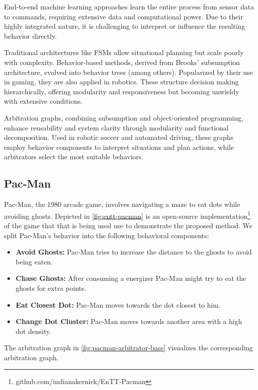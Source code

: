 End-to-end machine learning approaches learn the entire process from sensor data to commands, requiring extensive data and computational power.
Due to their highly integrated nature, it is challenging to interpret or influence the resulting behavior directly.

Traditional architectures like \glspl{FSM} allow situational planning but scale poorly with complexity. Behavior-based methods, derived from Brooks' subsumption architecture, evolved into behavior trees (among others). Popularized by their use in gaming, they are also applied in robotics. These structure decision making hierarchically, offering modularity and responsiveness but becoming unwieldy with extensive conditions.

Arbitration graphs, combining subsumption and object-oriented programming, enhance reusability and system clarity through modularity and functional decomposition. Used in robotic soccer and automated driving, these graphs employ behavior components to interpret situations and plan actions, while arbitrators select the most suitable behaviors.

\subsection{Pac-Man}
Pac-Man, the 1980 arcade game, involves navigating a maze to eat dots while avoiding ghosts.
Depicted in \cref{fig:entt-pacman} is an open-source implementation\footnote{github.com/indianakernick/EnTT-Pacman}  of the game that that is being used use to demonstrate the proposed method.
We split Pac-Man's behavior into the following behavioral components:

\begin{itemize}
    \item \textbf{Avoid Ghosts:} Pac-Man tries to increase the distance to the ghosts to avoid being eaten.
    \item \textbf{Chase Ghosts:} After consuming a energizer Pac-Man might try to eat the ghosts for extra points.
    \item \textbf{Eat Closest Dot:} Pac-Man moves towards the dot closest to him.
    \item \textbf{Change Dot Cluster:} Pac-Man moves towards another area with a high dot density.
\end{itemize}

The arbitration graph in \cref{fig:pacman-arbitrator-base} visualizes the corresponding arbitration graph.

